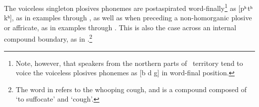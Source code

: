 The voiceless singleton plosives phonemes are postaspirated word-finally\footnote{Note, however, that speakers from the northern parts of \PS\ territory tend to voice the voiceless plosives phonemes as [b d g] in word-final position.} 
as [pʰ\,tʰ\,kʰ], as in examples  through , as well as when preceding a non-homor\-ga\-nic plosive or affricate, as in examples  through . This is also the case across an internal compound boundary, as in .\footnote{The word  in  refers to the whooping cough, and is a compound composed of  ‘to suffocate’ and  ‘cough’.}

